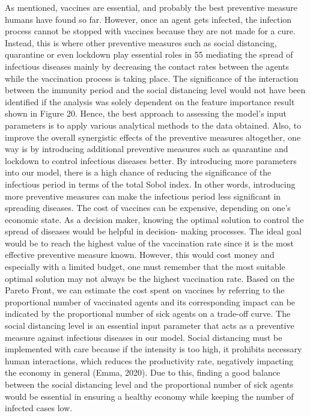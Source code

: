 \documentclass[smallextended]{svjour3}       %
\begin{document}
As mentioned, vaccines are essential, and probably the best preventive measure humans have found so far. However, once an agent gets infected, the infection process cannot be stopped with vaccines because they are not made for a cure. Instead, this is where other preventive measures such as social distancing, quarantine or even lockdown play essential roles in
55
mediating the spread of infectious diseases mainly by decreasing the contact rates between the agents while the vaccination process is taking place. The significance of the interaction between the immunity period and the social distancing level would not have been identified if the analysis was solely dependent on the feature importance result shown in Figure 20. Hence, the best approach to assessing the model’s input parameters is to apply various analytical methods to the data obtained. Also, to improve the overall synergistic effects of the preventive measures altogether, one way is by introducing additional preventive measures such as quarantine and lockdown to control infectious diseases better. By introducing more parameters into our model, there is a high chance of reducing the significance of the infectious period in terms of the total Sobol index. In other words, introducing more preventive measures can make the infectious period less significant in spreading diseases.
The cost of vaccines can be expensive, depending on one's economic state. As a decision maker, knowing the optimal solution to control the spread of diseases would be helpful in decision- making processes. The ideal goal would be to reach the highest value of the vaccination rate since it is the most effective preventive measure known. However, this would cost money and especially with a limited budget, one must remember that the most suitable optimal solution may not always be the highest vaccination rate. Based on the Pareto Front, we can estimate the cost spent on vaccines by referring to the proportional number of vaccinated agents and its corresponding impact can be indicated by the proportional number of sick agents on a trade-off curve.
The social distancing level is an essential input parameter that acts as a preventive measure against infectious diseases in our model. Social distancing must be implemented with care because if the intensity is too high, it prohibits necessary human interactions, which reduces the productivity rate, negatively impacting the economy in general (Emma, 2020). Due to this, finding a good balance between the social distancing level and the proportional number of sick agents would be essential in ensuring a healthy economy while keeping the number of infected cases low.
\end{document}
